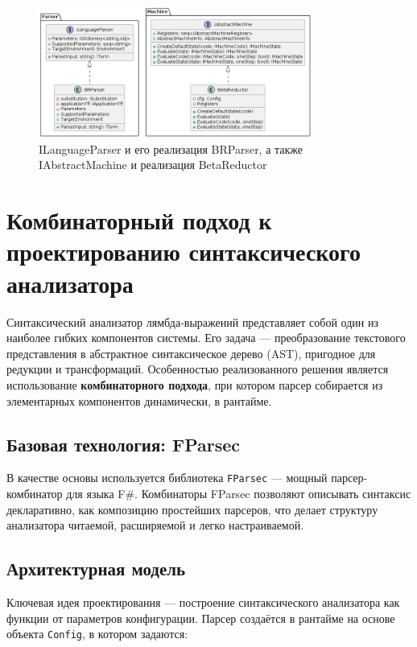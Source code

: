 \begin{figure}[h]
  \centering
  \includegraphics[width=0.8\textwidth]{./img/IAbstract.jpg}
  \caption{ILanguageParser и его реализация BRParser, а также IAbstractMachine и реализация BetaReductor}
  \label{fig:IAbstract}
\end{figure}

\section{Комбинаторный подход к проектированию синтаксического анализатора}
\label{sec:parser-api}

Синтаксический анализатор лямбда‑выражений представляет собой один из наиболее гибких компонентов системы. Его задача — преобразование текстового представления в абстрактное синтаксическое дерево (AST), пригодное для редукции и трансформаций. Особенностью реализованного решения является использование \textbf{комбинаторного подхода}, при котором парсер собирается из элементарных компонентов динамически, в рантайме.

\subsection{Базовая технология: FParsec}

В качестве основы используется библиотека \texttt{FParsec} — мощный парсер-комбинатор для языка F\#. Комбинаторы FParsec позволяют описывать синтаксис декларативно, как композицию простейших парсеров, что делает структуру анализатора читаемой, расширяемой и легко настраиваемой.

\subsection{Архитектурная модель}

Ключевая идея проектирования — построение синтаксического анализатора как функции от параметров конфигурации. Парсер создаётся в рантайме на основе объекта \texttt{Config}, в котором задаются:

